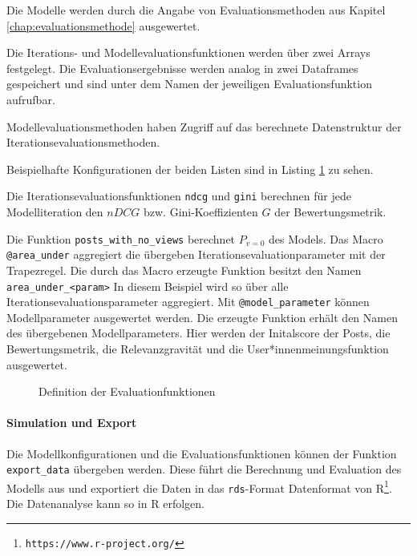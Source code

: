 Die Modelle werden durch die Angabe von Evaluationsmethoden aus Kapitel \ref{chap:evaluationsmethode} ausgewertet.

Die Iterations- und Modellevaluationsfunktionen werden über zwei Arrays festgelegt. Die Evaluationsergebnisse werden analog in zwei Dataframes gespeichert und sind unter dem Namen der jeweiligen Evaluationsfunktion aufrufbar.

Modellevaluationsmethoden haben Zugriff auf das berechnete Datenstruktur der Iterationsevaluationsmethoden.

Beispielhafte Konfigurationen der beiden Listen sind in Listing \ref{lst:eval_param} zu sehen. 

Die Iterationsevaluationsfunktionen \texttt{ndcg} und \texttt{gini} berechnen für jede Modelliteration den $nDCG$ bzw. Gini-Koeffizienten $G$ der Bewertungsmetrik. 

Die Funktion \texttt{posts\_with\_no\_views} berechnet $P_{v = 0}$ des Models. Das Macro \texttt{@area\_under} aggregiert die übergeben Iterationsevaluationparameter mit der Trapezregel. Die durch das Macro erzeugte Funktion besitzt den Namen \texttt{area\_under\_<param>} In diesem Beispiel wird so über alle Iterationsevaluationsparameter aggregiert. Mit \texttt{@model\_parameter} können Modellparameter ausgewertet werden. Die erzeugte Funktion erhält den Namen des übergebenen Modellparameters. Hier werden der Initalscore der Posts, die Bewertungsmetrik, die Relevanzgravität und die User*innenmeinungsfunktion ausgewertet.


\begin{figure}[!h]
	\caption{Definition der Evaluationfunktionen}
	
	\label{lst:eval_param}
\end{figure}


\captionsetup[figure]{name=Abbildung}

\paragraph{Simulation und Export}
Die Modellkonfigurationen und die Evaluationsfunktionen können der Funktion \texttt{export\_data} übergeben werden. Diese führt die Berechnung und Evaluation des Modells aus und exportiert die Daten in das \texttt{rds}-Format Datenformat von R\footnote{\texttt{https://www.r-project.org/}}. Die Datenanalyse kann so in R erfolgen.


